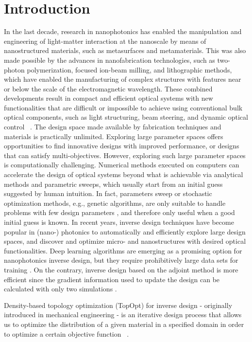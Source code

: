 \documentclass[aps,prl,twocolumn,superscriptaddress,longbibliography]{revtex4-1}
\begin{document}
\section{Introduction}\label{Sec:Introduction}
In the last decade, research in nanophotonics has enabled the manipulation and engineering of light-matter interaction at the nanoscale by means of nanostructured materials, such as metasurfaces and metamaterials. This was also made possible by the advances in nanofabrication technologies, such as two-photon polymerization, focused ion-beam milling, and lithographic methods, which have enabled the manufacturing of complex structures with features near or below the scale of the electromagnetic wavelength. These combined developments result in compact and efficient optical systems with new functionalities that are difficult or impossible to achieve using conventional bulk optical components, such as light structuring, beam steering, and dynamic optical control ~\cite{2018NaPho..12..659M}. The design space made available by fabrication techniques and materials is practically unlimited. Exploring large parameter spaces offers opportunities to find innovative designs with improved performance, or designs that can satisfy multi-objectives. However, exploring such large parameter spaces is computationally challenging. Numerical methods executed on computers can accelerate the design of optical systems beyond what is achievable via analytical methods and parametric sweeps, which usually start from an initial guess suggested by human intuition. In fact, parameters sweep or stochastic optimization methods, e.g., genetic algorithms, are only suitable to handle problems with few design parameters \cite{Non-grad}, and therefore only useful when a good initial guess is known.
In recent years, inverse design techniques have become popular in (nano-) photonics to automatically and efficiently explore large design spaces, and discover and optimize micro- and nanostructures with desired optical functionalities. Deep learning algorithms are emerging as a promising option for nanophotonics inverse design, but they require prohibitively large data sets for training \cite{DeepNNs1, DeepNNs2}. On the contrary, inverse design based on the adjoint method is more efficient since the gradient information used to update the design can be calculated with only two simulations \cite{AdjointBook}.\par 
Density-based topology optimization (TopOpt) for inverse design - originally introduced in mechanical engineering - is an iterative design process that allows us to optimize the distribution of a given material in a specified domain in order to optimize a certain objective function ~\cite{Bendsoe2004,TopOptForNanophotonics,Nomura07,Hassan14Topology,TopOptTutorial,Hassan20Multilayer}. 
\end{document}
